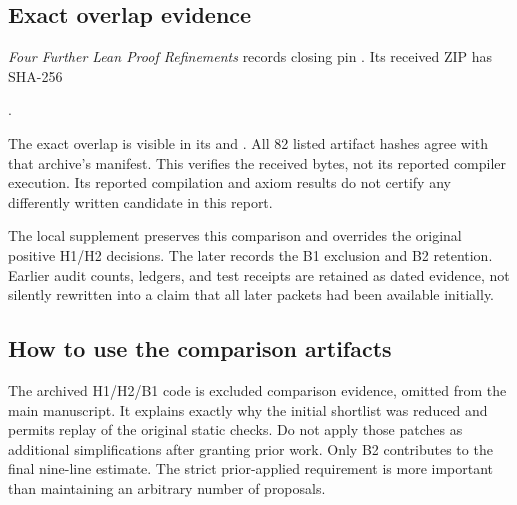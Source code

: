 \subsection{Exact overlap evidence}
\emph{Four Further Lean Proof Refinements} records closing pin . Its received ZIP has SHA-256
\begin{center}\small{}.\end{center}
The exact overlap is visible in its  and . All 82 listed artifact hashes agree with that archive's manifest. This verifies the received bytes, not its reported compiler execution. Its reported compilation and axiom results do not certify any differently written candidate in this report.

The local supplement  preserves this comparison and overrides the original positive H1/H2 decisions. The later  records the B1 exclusion and B2 retention. Earlier audit counts, ledgers, and test receipts are retained as dated evidence, not silently rewritten into a claim that all later packets had been available initially.

\subsection{How to use the comparison artifacts}
The archived H1/H2/B1 code is excluded comparison evidence, omitted from the main manuscript. It explains exactly why the initial shortlist was reduced and permits replay of the original static checks. Do not apply those patches as additional simplifications after granting prior work. Only B2 contributes to the final nine-line estimate. The strict prior-applied requirement is more important than maintaining an arbitrary number of proposals.
